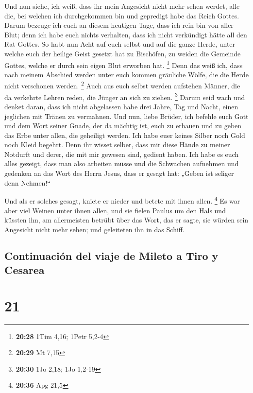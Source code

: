  Und nun siehe, ich weiß, dass ihr mein Angesicht nicht
mehr sehen werdet, alle die, bei welchen ich durchgekommen bin und
gepredigt habe das Reich Gottes.  Darum bezeuge ich euch
an diesem heutigen Tage, dass ich rein bin von aller Blut;
 denn ich habe euch nichts verhalten, dass ich nicht
verkündigt hätte all den Rat Gottes.  So habt nun Acht
auf euch selbst und auf die ganze Herde, unter welche euch der heilige
Geist gesetzt hat zu Bischöfen, zu weiden die Gemeinde Gottes, welche er
durch sein eigen Blut erworben hat. \footnote{\textbf{20:28} 1Tim 4,16;
  1Petr 5,2-4}  Denn das weiß ich, dass nach meinem
Abschied werden unter euch kommen gräuliche Wölfe, die die Herde nicht
verschonen werden. \footnote{\textbf{20:29} Mt 7,15} 
Auch aus euch selbst werden aufstehen Männer, die da verkehrte Lehren
reden, die Jünger an sich zu ziehen. \footnote{\textbf{20:30} 1Jo 2,18;
  1Jo 1,2-19}  Darum seid wach und denket daran, dass ich
nicht abgelassen habe drei Jahre, Tag und Nacht, einen jeglichen mit
Tränen zu vermahnen.  Und nun, liebe Brüder, ich befehle
euch Gott und dem Wort seiner Gnade, der da mächtig ist, euch zu erbauen
und zu geben das Erbe unter allen, die geheiligt werden. 
Ich habe euer keines Silber noch Gold noch Kleid begehrt.
 Denn ihr wisset selber, dass mir diese Hände zu meiner
Notdurft und derer, die mit mir gewesen sind, gedient haben.
 Ich habe es euch alles gezeigt, dass man also arbeiten
müsse und die Schwachen aufnehmen und gedenken an das Wort des Herrn
Jesus, dass er gesagt hat: „Geben ist seliger denn Nehmen!{}``

 Und als er solches gesagt, kniete er nieder und betete
mit ihnen allen. \footnote{\textbf{20:36} Apg 21,5}  Es
war aber viel Weinen unter ihnen allen, und sie fielen Paulus um den
Hals und küssten ihn,  am allermeisten betrübt über das
Wort, das er sagte, sie würden sein Angesicht nicht mehr sehen; und
geleiteten ihn in das Schiff.

\hypertarget{continuaciuxf3n-del-viaje-de-mileto-a-tiro-y-cesarea}{%
\subsection{Continuación del viaje de Mileto a Tiro y
Cesarea}\label{continuaciuxf3n-del-viaje-de-mileto-a-tiro-y-cesarea}}

\hypertarget{section-20}{%
\section{21}\label{section-20}}

